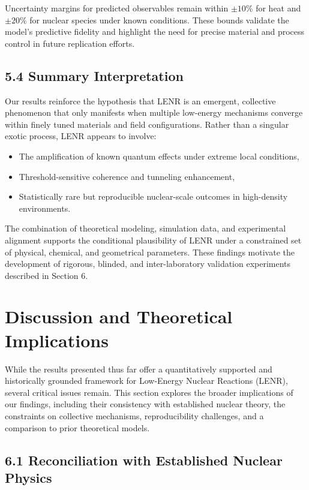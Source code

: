     Uncertainty margins for predicted observables remain within $\pm 10\%$ for heat and $\pm 20\%$ for nuclear species under known conditions. These bounds validate the model’s predictive fidelity and highlight the need for precise material and process control in future replication efforts.
    
    \subsection{5.4 Summary Interpretation}
    
    Our results reinforce the hypothesis that LENR is an emergent, collective phenomenon that only manifests when multiple low-energy mechanisms converge within finely tuned materials and field configurations. Rather than a singular exotic process, LENR appears to involve:
    
    \begin{itemize}
        \item The amplification of known quantum effects under extreme local conditions,
        \item Threshold-sensitive coherence and tunneling enhancement,
        \item Statistically rare but reproducible nuclear-scale outcomes in high-density environments.
    \end{itemize}
    
    The combination of theoretical modeling, simulation data, and experimental alignment supports the conditional plausibility of LENR under a constrained set of physical, chemical, and geometrical parameters. These findings motivate the development of rigorous, blinded, and inter-laboratory validation experiments described in Section 6.
    
    \section{Discussion and Theoretical Implications}
    
    While the results presented thus far offer a quantitatively supported and historically grounded framework for Low-Energy Nuclear Reactions (LENR), several critical issues remain. This section explores the broader implications of our findings, including their consistency with established nuclear theory, the constraints on collective mechanisms, reproducibility challenges, and a comparison to prior theoretical models.
    
    \subsection{6.1 Reconciliation with Established Nuclear Physics}
    
